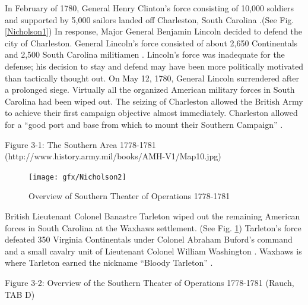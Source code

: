 In February of 1780, General Henry Clinton’s force consisting of 10,000 soldiers
and supported by 5,000 sailors landed off Charleston, South Carolina
\cite[p.6]{weigley_partisan_1970}.(See Fig. \ref{Nicholson1})
In response, Major General Benjamin Lincoln decided to defend the city of
Charleston.  General Lincoln’s force consisted of about 2,650 Continentals and
2,500 South Carolina militiamen \cite[p.6]{weigley_partisan_1970}.  Lincoln’s
force was inadequate for the defense; his decision to stay and defend may have
been more politically motivated than tactically thought out.  On May 12, 1780,
General Lincoln surrendered after a prolonged siege.  Virtually all the
organized American military forces in South Carolina had been wiped out.  The
seizing of Charleston allowed the British Army to achieve their first campaign
objective almost immediately.  Charleston allowed for a “good port and base from
which to mount their Southern Campaign” \cite[p.22]{woodward_comparative_2002}.


Figure 3-1: The Southern Area 1778-1781
(http://www.history.army.mil/books/AMH-V1/Map10.jpg)


\begin{figure}[h]
\begin{center}
\texttt{[image: gfx/Nicholson2]}
\end{center}
\caption{Overview of Southern Theater of Operations 1778-1781 \cite[Tab D, Map 1]{rauch_battle_2007}}
\label{Nicholson2}
\end{figure}

British Lieutenant Colonel Banastre Tarleton wiped out the remaining American
forces in South Carolina at the Waxhaws settlement.  (See Fig. \ref{Nicholson2})
Tarleton’s force defeated 350 Virginia Continentals under Colonel Abraham
Buford’s command and a small cavalry unit of Lieutenant Colonel William
Washington \cite[p.7]{weigley_partisan_1970}.  Waxhaws is where Tarleton earned the nickname
“Bloody Tarleton” \cite[p.20]{moncure_cowpens_1996}.

Figure 3-2: Overview of the Southern Theater of Operations 1778-1781 (Rauch, TAB D)


